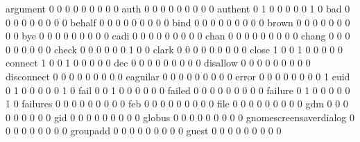 \documentclass[compress,8pt]{beamer}
\begin{document}
\begin{frame}
\begin{Schunk}
  argument                                   0   0   0   0   0   0   0   0   0
  auth                                       0   0   0   0   0   0   0   0   0
  authent                                    0   1   0   0   0   0   0   1   0
  bad                                        0   0   0   0   0   0   0   0   0
  behalf                                     0   0   0   0   0   0   0   0   0
  bind                                       0   0   0   0   0   0   0   0   0
  brown                                      0   0   0   0   0   0   0   0   0
  bye                                        0   0   0   0   0   0   0   0   0
  cadi                                       0   0   0   0   0   0   0   0   0
  chan                                       0   0   0   0   0   0   0   0   0
  chang                                      0   0   0   0   0   0   0   0   0
  check                                      0   0   0   0   0   0   1   0   0
  clark                                      0   0   0   0   0   0   0   0   0
  close                                      1   0   0   1   0   0   0   0   0
  connect                                    1   0   0   1   0   0   0   0   0
  dec                                        0   0   0   0   0   0   0   0   0
  disallow                                   0   0   0   0   0   0   0   0   0
  disconnect                                 0   0   0   0   0   0   0   0   0
  eaguilar                                   0   0   0   0   0   0   0   0   0
  error                                      0   0   0   0   0   0   0   0   1
  euid                                       0   1   0   0   0   0   0   1   0
  fail                                       0   0   1   0   0   0   0   0   0
  failed                                     0   0   0   0   0   0   0   0   0
  failure                                    0   1   0   0   0   0   0   1   0
  failures                                   0   0   0   0   0   0   0   0   0
  feb                                        0   0   0   0   0   0   0   0   0
  file                                       0   0   0   0   0   0   0   0   0
  gdm                                        0   0   0   0   0   0   0   0   0
  gid                                        0   0   0   0   0   0   0   0   0
  globus                                     0   0   0   0   0   0   0   0   0
  gnomescreensaverdialog                     0   0   0   0   0   0   0   0   0
  groupadd                                   0   0   0   0   0   0   0   0   0
  guest                                      0   0   0   0   0   0   0   0   0

\end{Schunk}
\end{frame}
\end{document}
